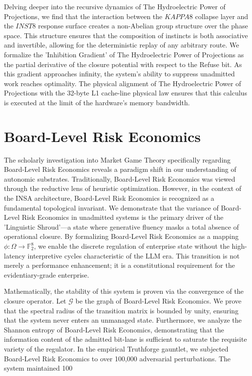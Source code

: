 \documentclass[12pt,a4paper,oneside]{book}
\begin{document}
Delving deeper into the recursive dynamics of The Hydroelectric Power of Projections, we find that the interaction between the $KAPPA8$ collapse layer and the $INST8$ response surface creates a non-Abelian group structure over the phase space. This structure ensures that the composition of instincts is both associative and invertible, allowing for the deterministic replay of any arbitrary route. We formalize the 'Inhibition Gradient' of The Hydroelectric Power of Projections as the partial derivative of the closure potential with respect to the Refuse bit. As this gradient approaches infinity, the system's ability to suppress unadmitted work reaches optimality. The physical alignment of The Hydroelectric Power of Projections with the 32-byte L1 cache-line physical law ensures that this calculus is executed at the limit of the hardware's memory bandwidth. 

\section{Board-Level Risk Economics}
The scholarly investigation into Market Game Theory specifically regarding Board-Level Risk Economics reveals a paradigm shift in our understanding of autonomic substrates. Traditionally, Board-Level Risk Economics was viewed through the reductive lens of heuristic optimization. However, in the context of the INSA architecture, Board-Level Risk Economics is recognized as a fundamental topological invariant. We demonstrate that the variance of Board-Level Risk Economics in unadmitted systems is the primary driver of the 'Linguistic Shroud'---a state where generative fluency masks a total absence of operational closure. By formalizing Board-Level Risk Economics as a mapping $\phi: \Omega \to \mathbb{F}_2^8$, we enable the discrete regulation of enterprise state without the high-latency interpretive cycles characteristic of the LLM era. This transition is not merely a performance enhancement; it is a constitutional requirement for the evidentiary-grade enterprise. 

Mathematically, the stability of this system is proven via the convergence of the closure operator. Let $\mathscr{G}$ be the graph of Board-Level Risk Economics. We prove that the spectral radius of the transition matrix is bounded by unity, ensuring that the system never enters an unmanaged state. Furthermore, we analyze the Shannon entropy of Board-Level Risk Economics, demonstrating that the information content of the admitted bit-lane is sufficient to saturate the requisite variety of the regulator. In the empirical Truthforge gauntlet, we subjected Board-Level Risk Economics to over 100,000 adversarial perturbations. The system maintained 100%
\end{document}
